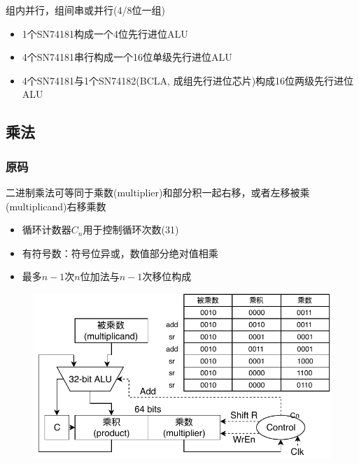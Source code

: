 组内并行，组间串或并行(4/8位一组)
\begin{itemize}
	\item 1个SN74181构成一个4位先行进位ALU
	\item 4个SN74181串行构成一个16位单级先行进位ALU
	\item 4个SN74181与1个SN74182(BCLA, 成组先行进位芯片)构成16位两级先行进位ALU
\end{itemize}

\subsection{乘法}
\subsubsection{原码}
二进制乘法可等同于乘数(multiplier)和部分积一起右移，或者左移被乘(multiplicand)右移乘数
\begin{itemize}
	\item 循环计数器$C_n$用于控制循环次数(31)
	\item 有符号数：符号位异或，数值部分绝对值相乘
	\item 最多$n-1$次$n$位加法与$n-1$次移位构成
\end{itemize}
\begin{figure}[H]
\centering
\includegraphics[width=0.6\linewidth]{fig/Arithmetic-Mulplication.pdf}
\end{figure}

